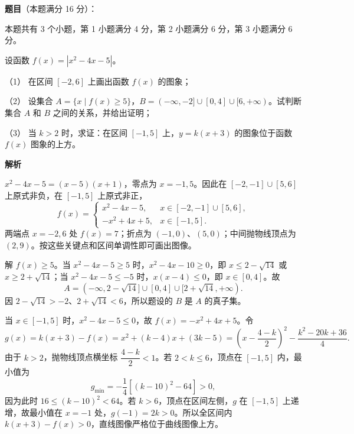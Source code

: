 \begin{answer}

\textbf{题目}（本题满分 16 分）：

本题共有 3 个小题，第 1 小题满分 4 分，第 2 小题满分 6 分，第 3 小题满分 6 分。

设函数 $f(x)=|x^2-4x-5|$。

（1） 在区间 $[-2,6]$ 上画出函数 $f(x)$ 的图象；

（2） 设集合 $A=\{x\mid f(x)\geq5\}$，$B=(-\infty,-2]\cup[0,4]\cup[6,+\infty)$。试判断集合 $A$ 和 $B$ 之间的关系，并给出证明；

（3） 当 $k>2$ 时，求证：在区间 $[-1,5]$ 上，$y=k(x+3)$ 的图象位于函数 $f(x)$ 图象的上方。
\nopagebreak[4]
\begin{center}\end{center}
\nopagebreak[4]
\textbf{解析}
\nopagebreak[4]
\begin{center}\end{center}
\nopagebreak[4]

$x^2-4x-5=(x-5)(x+1)$，零点为 $x=-1,5$。因此在 $[-2,-1]\cup[5,6]$ 上原式非负，在 $[-1,5]$ 上原式非正，
\nopagebreak[4]
\[
f(x)=
\begin{cases}
x^2-4x-5,&x\in[-2,-1]\cup[5,6],\\
-x^2+4x+5,&x\in[-1,5].
\end{cases}
\]
两端点 $x=-2,6$ 处 $f(x)=7$；折点为 $(-1,0)$、$(5,0)$；中间抛物线顶点为 $(2,9)$。按这些关键点和区间单调性即可画出图像。


解 $f(x)\geq5$。当 $x^2-4x-5\geq5$ 时，$x^2-4x-10\geq0$，即 $x\leq2-\sqrt{14}$ 或 $x\geq2+\sqrt{14}$；当 $x^2-4x-5\leq-5$ 时，$x(x-4)\leq0$，即 $x\in[0,4]$。故
\nopagebreak[4]
\[
A=(-\infty,2-\sqrt{14}]\cup[0,4]\cup[2+\sqrt{14},+\infty).
\]
因 $2-\sqrt{14}>-2$、$2+\sqrt{14}<6$，所以题设的 $B$ 是 $A$ 的真子集。


当 $x\in[-1,5]$ 时，$x^2-4x-5\leq0$，故 $f(x)=-x^2+4x+5$。令
\nopagebreak[4]
\[
g(x)=k(x+3)-f(x)=x^2+(k-4)x+(3k-5)
=\left(x-\frac{4-k}{2}\right)^2-\frac{k^2-20k+36}{4}.
\]
由于 $k>2$，抛物线顶点横坐标 $\dfrac{4-k}{2}<1$。若 $2<k\leq6$，顶点在 $[-1,5]$ 内，最小值为
\nopagebreak[4]
\[
g_{\min}=-\frac14[(k-10)^2-64]>0,
\]
因为此时 $16\leq(k-10)^2<64$。若 $k>6$，顶点在区间左侧，$g$ 在 $[-1,5]$ 上递增，故最小值在 $x=-1$ 处，$g(-1)=2k>0$。所以全区间内 $k(x+3)-f(x)>0$，直线图像严格位于曲线图像上方。


\gkanswer{答案（2）：$B\subsetneq A=(-\infty,2-\sqrt{14}]\cup[0,4]\cup[2+\sqrt{14},+\infty)$}


\end{answer}

